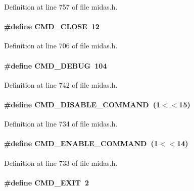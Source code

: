 Definition at line 757 of file midas.h.
\paragraph[{CMD\_\-CLOSE}]{\setlength{\rightskip}{0pt plus 5cm}\#define CMD\_\-CLOSE~12}\hfill\label{group__err26_ga0908ae0ea53f32f9e7bbb814b4ebc9b2}


Definition at line 706 of file midas.h.
\paragraph[{CMD\_\-DEBUG}]{\setlength{\rightskip}{0pt plus 5cm}\#define CMD\_\-DEBUG~104}\hfill\label{group__err26_ga683fa24dd0b15e2c602628e2b6352df3}


Definition at line 742 of file midas.h.
\paragraph[{CMD\_\-DISABLE\_\-COMMAND}]{\setlength{\rightskip}{0pt plus 5cm}\#define CMD\_\-DISABLE\_\-COMMAND~(1$<$$<$15)}\hfill\label{group__err26_ga8be979282bb43f9cb9610cf6781a5848}


Definition at line 734 of file midas.h.
\paragraph[{CMD\_\-ENABLE\_\-COMMAND}]{\setlength{\rightskip}{0pt plus 5cm}\#define CMD\_\-ENABLE\_\-COMMAND~(1$<$$<$14)}\hfill\label{group__err26_ga9401bfa83e98b37725994e9d9988b58c}


Definition at line 733 of file midas.h.
\paragraph[{CMD\_\-EXIT}]{\setlength{\rightskip}{0pt plus 5cm}\#define CMD\_\-EXIT~2}\hfill\label{group__err26_gacfa1d482ab47b3ceebb9717007111649}


